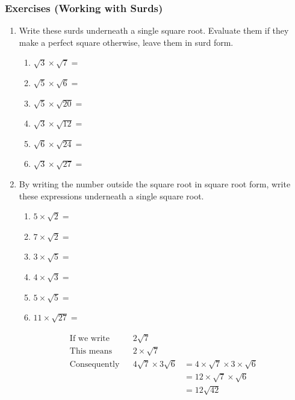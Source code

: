 \documentclass[a4paper,12pt]{article}
\begin{document}
\subsubsection{Exercises (Working with Surds)}\label{surds}
\begin{enumerate}
	\item Write these surds underneath a single square root. Evaluate them if they make a perfect square otherwise, leave them in surd form.
	\begin{multicols}{2}
		\begin{enumerate}
			\item $\displaystyle \sqrt{3}\times \sqrt{7}= $
			\item $\displaystyle \sqrt{5}\times \sqrt{6}= $
			\item $\displaystyle \sqrt{5}\times \sqrt{20}=$
			\item $\displaystyle \sqrt{3}\times \sqrt{12}=$
			\item $\displaystyle \sqrt{6}\times \sqrt{24}=$
			\item $\displaystyle \sqrt{3}\times \sqrt{27}=$		
		\end{enumerate}
	\end{multicols}
	\item By writing the number outside the square root in square root form, write these expressions underneath a single square root.
	\begin{multicols}{2}
		\begin{enumerate}
			\item $\displaystyle 5\times \sqrt{2}= $
			\item $\displaystyle 7\times \sqrt{2}= $
			\item $\displaystyle 3\times \sqrt{5}=$
			\item $\displaystyle 4\times \sqrt{3}=$
			\item $\displaystyle 5\times \sqrt{5}=$
			\item $\displaystyle 11\times \sqrt{27}=$		
		\end{enumerate}
	\end{multicols}
	\begin{align*}
	\text{If we write}&& 2\sqrt{7}&\\
	\text{This means}&& 2\times \sqrt{7}&\\
	\text{Consequently}&& 4\sqrt{7}\times 3\sqrt{6}&=4\times \sqrt{7}\times 3\times \sqrt{6}\\
	&&&=12\times \sqrt{7} \times \sqrt{6}\\
	&&&=12\sqrt{42}
	\end{align*}

\end{enumerate}
\end{document}
